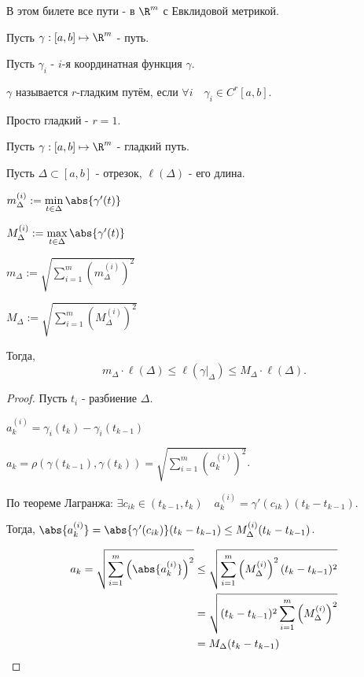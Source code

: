 
В этом билете все пути - в $\R^{m}$ с Евклидовой метрикой.

\begin{definition}[повтор] \thmslashn 

    Пусть $\gamma : [a, b] \mapsto \R^{m}$ - путь.

    Пусть $\gamma_{i} $ - $i$-я координатная функция $\gamma$.

    $\gamma$ называется $r$-гладким путём, если $\forall{i}\quad \gamma_{i}\in C^{r}[a, b]$.

    Просто гладкий - $r = 1$.
\end{definition}

\begin{lemma} \thmslashn

    Пусть $\gamma : [a, b] \mapsto \R^{m}$ - гладкий путь.

    Пусть $\Delta \subset [a, b]$ - отрезок, $\ell(\Delta)$ - его длина.

    $m^{(i)}_{\Delta} := \min\limits_{t\in \Delta} \abs{\gamma'(t)}$
    
    $M^{(i)}_{\Delta} := \max\limits_{t\in \Delta} \abs{\gamma'(t)}$

    $m_{\Delta} := \sqrt{\sum\limits_{i=1}^{m} \left(m^{(i)}_{\Delta}\right)^2} $
    
    $M_{\Delta} := \sqrt{\sum\limits_{i=1}^{m} \left(M^{(i)}_{\Delta}\right)^2}$

    Тогда, 
    \[ m_{\Delta} \cdot \ell(\Delta) \le \ell(\left. \gamma\right|_{\Delta}) \le M_{\Delta} \cdot \ell(\Delta) .\]
        \begin{proof} \thmslashn
        
            Пусть $t_{i}$ - разбиение $\Delta$.

            $a_{k}^{(i)} = \gamma_{i}(t_{k}) - \gamma_{i}(t_{k-1})$

            $a_{k} = \rho(\gamma(t_{k-1}), \gamma(t_{k})) = \sqrt{\sum\limits_{i=1}^{m} \left( a_{k}^{(i)} \right)^2 } $.

            По теореме Лагранжа: $\exists{c_{ik}\in (t_{k-1}, t_{k})}\quad a_{k}^{(i)} = \gamma'(c_{ik})(t_{k} - t_{k-1})$.

            Тогда, $\abs{a_{k}^{(i)}} = \abs{\gamma'(c_{ik})}(t_{k}-t_{k-1}) \le M_{\Delta}^{(i)}(t_{k}-t_{k-1})$.

            \begin{equation*}
                \begin{split}
                    a_{k} = \sqrt{\sum\limits_{i=1}^{m} \left( \abs{a_{k}^{(i)}} \right)^2} 
                    &\le \sqrt{\sum\limits_{i=1}^{m} \left(M_{\Delta}^{(i)}\right)^2(t_{k}-t_{k-1})^2}\\
                    &= \sqrt{(t_{k} - t_{k-1})^2 \sum\limits_{i=1}^{m} \left(M_{\Delta}^{(i)}\right)^2 }\\
                    &= M_{\Delta}(t_{k}-t_{k-1})
                \end{split}
            \end{equation*}
            

\end{proof}
\end{lemma}
